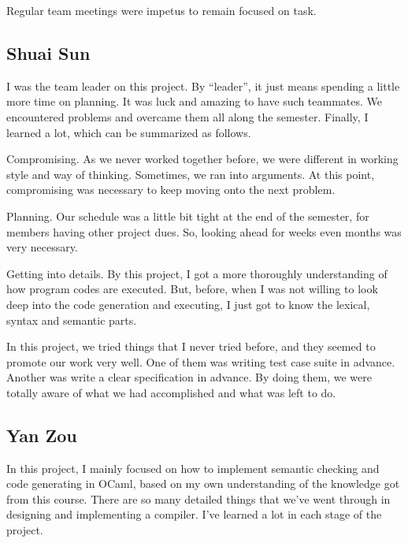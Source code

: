 \documentclass[12pt,psfig,a4]{article}
\begin{document}
Regular team meetings were impetus to remain focused on task.


\subsection{Shuai Sun}
I was the team leader on this project. By ``leader'', it just means spending a little more time on planning. It was luck and amazing to have such teammates. We encountered problems and overcame them all along the semester. Finally, I learned a lot, which can be summarized as follows.

Compromising. As we never worked together before, we were different in working style and way of thinking. Sometimes, we ran into arguments. At this point, compromising was necessary to keep moving onto the next problem.

Planning. Our schedule was a little bit tight at the end of the semester, for members having other project dues. So, looking ahead for weeks even months was very necessary. 

Getting into details. By this project, I got a more thoroughly understanding of how program codes are executed. But, before, when I was not willing to look deep into the code generation and executing, I just got to know the lexical, syntax and semantic parts.

In this project, we tried things that I never tried before, and they seemed to promote our work very well. One of them was writing test case suite in advance. Another was write a clear specification in advance. By doing them, we were totally aware of what we had accomplished and what was left to do.

\subsection{Yan Zou}
In this project, I mainly focused on how to implement semantic checking and code generating in OCaml, based on my own understanding of the knowledge got from this course. There are so many detailed things that we've went through in designing and implementing a compiler. I've learned a lot in each stage of the project.
\end{document}
